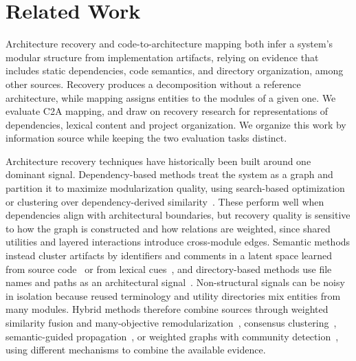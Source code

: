 \section{Related Work\label{sec:work}}

Architecture recovery and code-to-architecture mapping both infer a system's modular structure from implementation artifacts, relying on evidence that includes static dependencies, code semantics, and directory organization, among other sources. Recovery produces a decomposition without a reference architecture, while mapping assigns entities to the modules of a given one. We evaluate C2A mapping, and draw on recovery research for representations of dependencies, lexical content and project organization. We organize this work by information source while keeping the two evaluation tasks distinct.

Architecture recovery techniques have historically been built around one dominant signal. Dependency-based methods treat the system as a graph and partition it to maximize modularization quality, using search-based optimization~\cite{bunch,bunch_sahc_nahc,dagc,wca,mca_eca} or clustering over dependency-derived similarity~\cite{cct,hcc_2019,limbo,fca,neighborhood_tree_2019,gma_2021}. These perform well when dependencies align with architectural boundaries, but recovery quality is sensitive to how the graph is constructed and how relations are weighted, since shared utilities and layered interactions introduce cross-module edges. Semantic methods instead cluster artifacts by identifiers and comments in a latent space learned from source code~\cite{arc,zbr,risi2012fold} or from lexical cues~\cite{kargar2017semantic}, and directory-based methods use file names and paths as an architectural signal~\cite{file_clustering}. Non-structural signals can be noisy in isolation because reused terminology and utility directories mix entities from many modules. Hybrid methods therefore combine sources through weighted similarity fusion and many-objective remodularization~\cite{sc_misra,escrc,nsga3,sadat2019multi}, consensus clustering~\cite{ensemble_recovery}, semantic-guided propagation~\cite{evol}, or weighted graphs with community detection~\cite{sade,sarif}, using different mechanisms to combine the available evidence.

